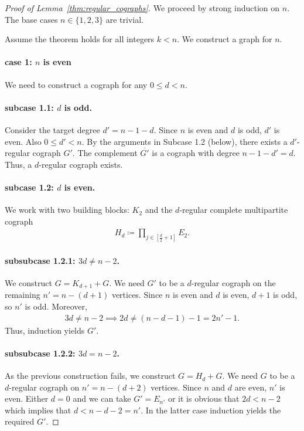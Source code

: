 \documentclass{article}
\theoremstyle{definition}
\theoremstyle{definition}
\theoremstyle{definition}
\theoremstyle{definition}
\theoremstyle{definition}
\theoremstyle{definition}
\theoremstyle{definition}
\theoremstyle{definition}
\theoremstyle{definition}
\theoremstyle{definition}
\newenvironment{proofref}[2]{%
  \begin{proof}[Proof of #1~\ref{#2}]%
}{%
  \end{proof}%
}
\begin{document}
\begin{proofref}{Lemma}{thm:regular_cographs}
    
We proceed by strong induction on $n$.
The base cases $n \in \{1, 2, 3 \}$ are trivial.

Assume the theorem holds for all integers $k < n$. We construct a graph for $n$.

\paragraph{case 1: $n$ is even}
We need to construct a cograph for any $0 \le d < n$.

\paragraph{subcase 1.1: $d$ is odd.}
Consider the target degree $d' = n - 1 - d$. Since $n$ is even and $d$ is odd, $d'$ is even. Also $0 \le d' < n$. By the arguments in Subcase 1.2 (below), there exists a $d'$-regular cograph $G'$. The complement $\overline{G'}$ is a cograph with degree $n - 1 - d' = d$. Thus, a $d$-regular cograph exists.

\paragraph{subcase 1.2: $d$ is even.}
We work with two building blocks: $K_2$ and the $d$-regular complete multipartite  cograph
\begin{align}
    H_d \coloneq \prod_{j \in \left[ \frac{d}{2} + 1 \right]} E_2.
\end{align}

\paragraph{subsubcase 1.2.1: $3d \neq n-2$.}
    We construct $G = K_{d+1} + G$.
    We need $G'$ to be a $d$-regular cograph on the remaining $n' = n - (d+1)$ vertices.
    Since $n$ is even and $d$ is even, $d+1$ is odd, so $n'$ is odd.
    Moreover, 
    \begin{align}
        3d \neq n - 2 \implies 2d \neq (n - d - 1) - 1 = 2n' - 1.
    \end{align}
    Thus, induction yields $G'$.

\paragraph{subsubcase 1.2.2: $3d = n-2$.}
    As the previous construction fails, we construct $G = H_d + G$. 
    We need $G$ to be a $d$-regular cograph on $n' = n - (d+2)$ vertices.
    Since $n$ and $d$ are even, $n'$ is even.
    Either $d = 0$ and we can take $G' = E_{n'}$ or it is obvious that $2d < n-2$ which implies that $d < n - d - 2 = n'$. In the latter case induction yields the required $G'$.


\end{proofref}
\end{document}
